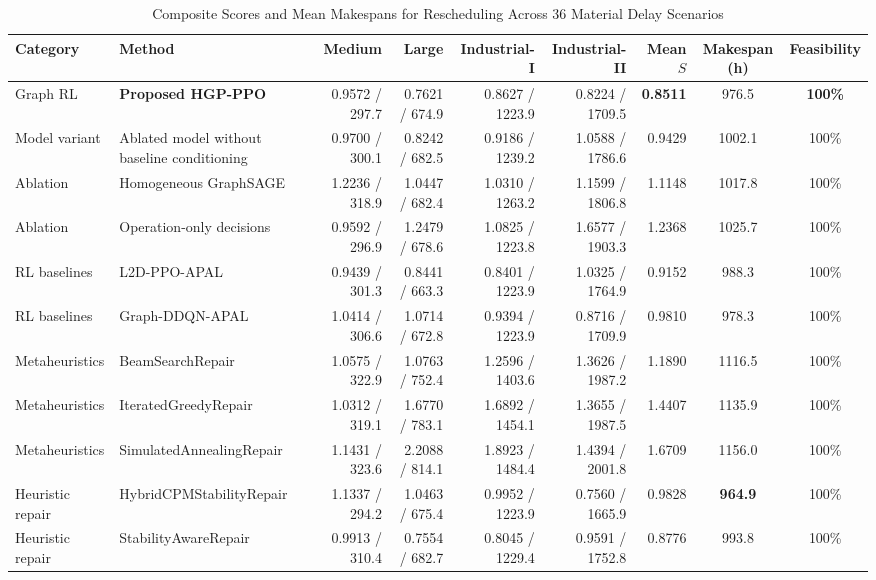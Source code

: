 \documentclass[journal,10pt]{IEEEtran}
\renewcommand{\arraystretch}{1.04}
\begin{document}
\begin{table}[!t]
\centering
\caption{Composite Scores and Mean Makespans for Rescheduling Across 36 Material Delay Scenarios}
\label{tab:resched_master}
\setlength{\tabcolsep}{6pt}
\renewcommand{\arraystretch}{0.98}
\begin{adjustbox}{max width=\textwidth}
\begin{tabular}{@{}llrrrrrcc@{}}
\toprule
\textbf{Category} & \textbf{Method} & \textbf{Medium} & \textbf{Large} & \textbf{Industrial-I} & \textbf{Industrial-II} & \textbf{Mean $S$} & \textbf{Makespan (h)} & \textbf{Feasibility} \\
\midrule
Graph RL & \textbf{Proposed HGP-PPO} & 0.9572 / 297.7 & 0.7621 / 674.9 & 0.8627 / 1223.9 & 0.8224 / 1709.5 & \textbf{0.8511} & 976.5 & \textbf{100\%} \\
Model variant & Ablated model without baseline conditioning & 0.9700 / 300.1 & 0.8242 / 682.5 & 0.9186 / 1239.2 & 1.0588 / 1786.6 & 0.9429 & 1002.1 & 100\% \\
Ablation & Homogeneous GraphSAGE & 1.2236 / 318.9 & 1.0447 / 682.4 & 1.0310 / 1263.2 & 1.1599 / 1806.8 & 1.1148 & 1017.8 & 100\% \\
Ablation & Operation-only decisions & 0.9592 / 296.9 & 1.2479 / 678.6 & 1.0825 / 1223.8 & 1.6577 / 1903.3 & 1.2368 & 1025.7 & 100\% \\
RL baselines & L2D-PPO-APAL & 0.9439 / 301.3 & 0.8441 / 663.3 & 0.8401 / 1223.9 & 1.0325 / 1764.9 & 0.9152 & 988.3 & 100\% \\
RL baselines & Graph-DDQN-APAL & 1.0414 / 306.6 & 1.0714 / 672.8 & 0.9394 / 1223.9 & 0.8716 / 1709.9 & 0.9810 & 978.3 & 100\% \\
Metaheuristics & BeamSearchRepair & 1.0575 / 322.9 & 1.0763 / 752.4 & 1.2596 / 1403.6 & 1.3626 / 1987.2 & 1.1890 & 1116.5 & 100\% \\
Metaheuristics & IteratedGreedyRepair & 1.0312 / 319.1 & 1.6770 / 783.1 & 1.6892 / 1454.1 & 1.3655 / 1987.5 & 1.4407 & 1135.9 & 100\% \\
Metaheuristics & SimulatedAnnealingRepair & 1.1431 / 323.6 & 2.2088 / 814.1 & 1.8923 / 1484.4 & 1.4394 / 2001.8 & 1.6709 & 1156.0 & 100\% \\
Heuristic repair & HybridCPMStabilityRepair & 1.1337 / 294.2 & 1.0463 / 675.4 & 0.9952 / 1223.9 & 0.7560 / 1665.9 & 0.9828 & \textbf{964.9} & 100\% \\
Heuristic repair & StabilityAwareRepair & 0.9913 / 310.4 & 0.7554 / 682.7 & 0.8045 / 1229.4 & 0.9591 / 1752.8 & 0.8776 & 993.8 & 100\% \\

\end{tabular}
\end{adjustbox}
\end{table}
\end{document}
